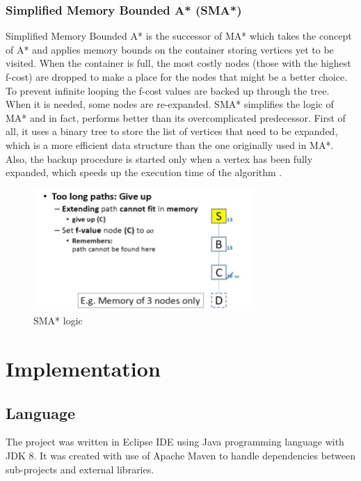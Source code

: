 \documentclass[12pt]{article}
\begin{document}
\subsubsection{Simplified Memory Bounded A* (SMA*)}

Simplified Memory Bounded A* is the successor of MA* which takes the concept of A* and applies memory bounds on the container storing vertices yet to be visited. When the container is full, the most costly nodes (those with the highest f-cost) are dropped to make a place for the nodes that might be a better choice. To prevent infinite looping the f-cost values are backed up through the tree. When it is needed, some nodes are re-expanded. SMA* simplifies the logic of MA* and in fact, performs better than its overcomplicated predecessor. First of all, it uses a binary tree to store the list of vertices that need to be expanded, which is a more efficient data structure than the one originally used in MA*. Also, the backup procedure is started only when a vertex has been fully expanded, which speeds up the execution time of the algorithm \cite{GCAI2017:Enhanced_Simplified_Memory_bounded_Star}.

\begin{figure}[h]
    \includegraphics[width=0.75\textwidth]{smastar}
    \centering
    \caption{SMA* logic \cite{smastar_image}}
\end{figure}

\section{Implementation}

\subsection{Language}

The project was written in Eclipse IDE using Java programming language with JDK 8. It was created with use of Apache Maven to handle dependencies between sub-projects and external libraries. 
\end{document}
